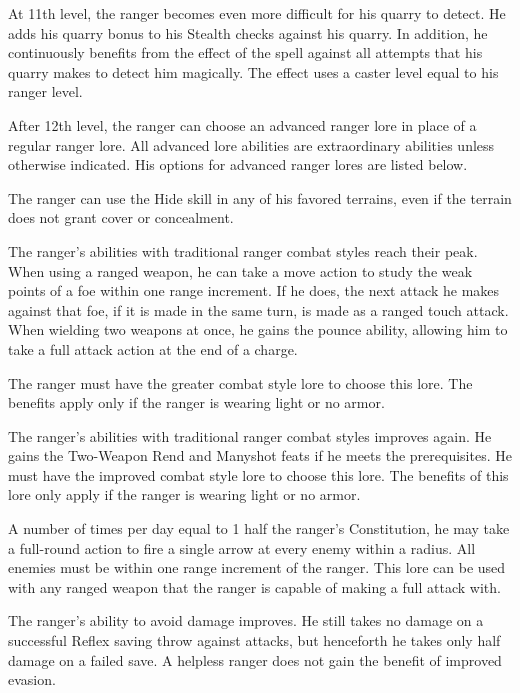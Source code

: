  At 11th level, the ranger becomes even more difficult for his quarry to detect. He adds his quarry bonus to his Stealth checks against his quarry. In addition, he continuously benefits from the effect of the  spell against all attempts that his quarry makes to detect him magically. The effect uses a caster level equal to his ranger level.

 After 12th level, the ranger can choose an advanced ranger lore in place of a regular ranger lore. All advanced lore abilities are extraordinary abilities unless otherwise indicated. His options for advanced ranger lores are listed below.

 The ranger can use the Hide skill in any of his favored terrains, even if the terrain does not grant cover or concealment.

 The ranger's abilities with traditional ranger combat styles reach their peak. When using a ranged weapon, he can take a move action to study the weak points of a foe within one range increment. If he does, the next attack he makes against that foe, if it is made in the same turn, is made as a ranged touch attack. When wielding two weapons at once, he gains the pounce ability, allowing him to take a full attack action at the end of a charge.

The ranger must have the greater combat style lore to choose this lore. The benefits apply only if the ranger is wearing light or no armor.

 The ranger's abilities with traditional ranger combat styles improves again. He gains the Two-Weapon Rend and Manyshot feats if he meets the prerequisites. He must have the improved combat style lore to choose this lore. The benefits of this lore only apply if the ranger is wearing light or no armor.

 A number of times per day equal to 1 \add half the ranger's Constitution, he may take a full-round action to fire a single arrow at every enemy within a \areamed radius. All enemies must be within one range increment of the ranger. This lore can be used with any ranged weapon that the ranger is capable of making a full attack with.

 The ranger's ability to avoid damage improves. He still takes no damage on a successful Reflex saving throw against attacks, but henceforth he takes only half damage on a failed save. A helpless ranger does not gain the benefit of improved evasion.

